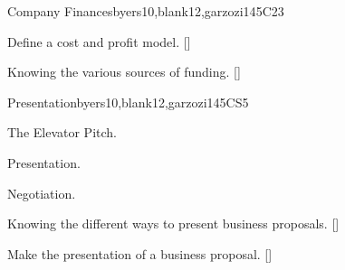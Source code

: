 \begin{syllabus}
\begin{unit}{}{Company Finances}{byers10,blank12,garzozi14}{5}{C23}
      \begin{learningoutcomes} 
         \item Define a cost and profit model. [\Assessment]
         \item Knowing the various sources of funding. [\Familiarity]
      \end{learningoutcomes} 
   \end{unit}
   
   \begin{unit}{}{Presentation}{byers10,blank12,garzozi14}{5}{CS5}
      \begin{topics}
         \item The Elevator Pitch.
         \item Presentation.
         \item Negotiation.
       \end{topics}
   
      \begin{learningoutcomes} 
         \item Knowing the different ways to present business proposals. [\Familiarity]
         \item Make the presentation of a business proposal. [\Usage]
      \end{learningoutcomes} 
   \end{unit}
   
   \begin{coursebibliography}
   \end{coursebibliography}
   
   \end{syllabus}
   
   